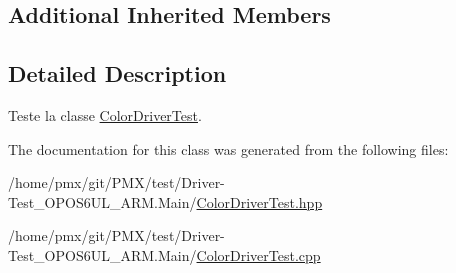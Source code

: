 \subsection*{Additional Inherited Members}


\subsection{Detailed Description}
Teste la classe \hyperlink{classtest_1_1ColorDriverTest}{Color\+Driver\+Test}. 

The documentation for this class was generated from the following files\+:\begin{DoxyCompactItemize}
\item 
/home/pmx/git/\+P\+M\+X/test/\+Driver-\/\+Test\+\_\+\+O\+P\+O\+S6\+U\+L\+\_\+\+A\+R\+M.\+Main/\hyperlink{ColorDriverTest_8hpp}{Color\+Driver\+Test.\+hpp}\item 
/home/pmx/git/\+P\+M\+X/test/\+Driver-\/\+Test\+\_\+\+O\+P\+O\+S6\+U\+L\+\_\+\+A\+R\+M.\+Main/\hyperlink{ColorDriverTest_8cpp}{Color\+Driver\+Test.\+cpp}\end{DoxyCompactItemize}
